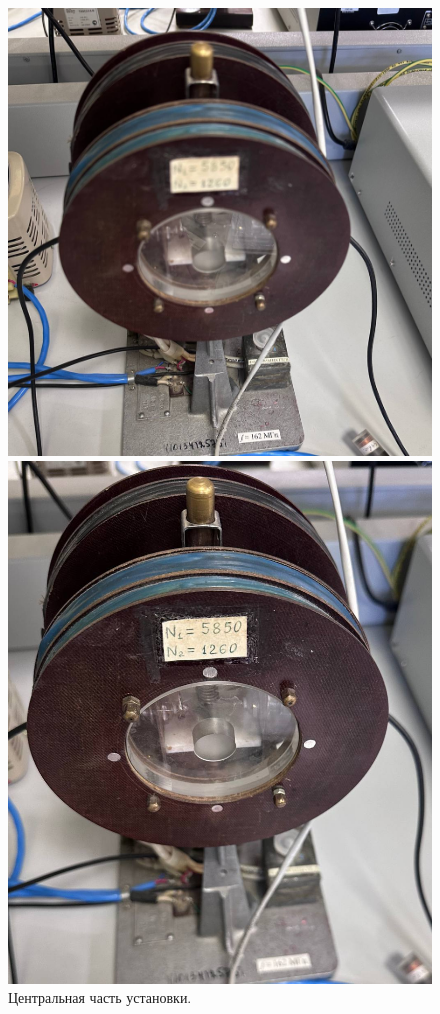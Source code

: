 \documentclass[a4paper, 12pt]{article} %
\begin{document}
	\begin{figure}[h!]
		\centering
		\begin{minipage}{0.6\textwidth}
			\centering
			\includegraphics[width=0.8\linewidth]{photos/coil_front.jpg}
		\end{minipage}%
		\begin{minipage}{0.5\textwidth}
			\centering
			\includegraphics[width=0.8\linewidth]{photos/coil_top.jpg}
		\end{minipage}
		\caption{Центральная часть установки.}
		\label{fig:coil}
	\end{figure}
	
\end{document}
